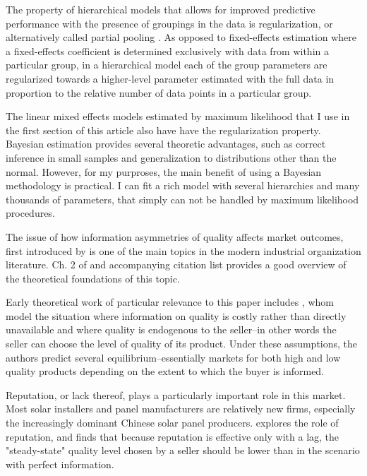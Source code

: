 \documentclass[a4paper]{article}
\begin{document}



The property of hierarchical models that allows for improved predictive performance with the presence of groupings in the data is regularization, or alternatively called partial pooling \citep{gelman_bayesian_2013}. As opposed to fixed-effects estimation where a fixed-effects coefficient is determined exclusively with data from within a particular group, in a hierarchical model each of the group parameters are regularized towards a higher-level parameter estimated with the full data in proportion to the relative number of data points in a particular group.

The linear mixed effects models estimated by maximum likelihood that I use in the first section of this article also have have the regularization property. Bayesian estimation provides several theoretic advantages, such as correct inference in small samples and generalization to distributions other than the normal. However, for my purproses, the main benefit of using a Bayesian methodology is practical. I can fit a rich model with several hierarchies and many thousands of parameters, that simply can not be handled by maximum likelihood procedures.

The issue of how information asymmetries of quality affects market outcomes, first introduced by \citet{akerlof_market_1970} is one of the main topics in the modern industrial organization literature. Ch. 2 of \citet{tirole_theory_1988} and accompanying citation list provides a good overview of the theoretical foundations of this topic.

Early theoretical work of particular relevance to this paper includes \citet{chan_prices_1982}, whom model the situation where information on quality is costly rather than directly unavailable and where quality is endogenous to the seller--in other words the seller can choose the level of quality of its product. Under these assumptions, the authors predict several equilibrium--essentially markets for both high and low quality products depending on the extent to which the buyer is informed.

Reputation, or lack thereof, plays a particularly important role in this market. Most solar installers and panel manufacturers are relatively new firms, especially the increasingly dominant Chinese solar panel producers. \citet{shapiro_consumer_1982} explores the role of reputation, and finds that because reputation is effective only with a lag, the "steady-state" quality level chosen by a seller should be lower than in the scenario with perfect information.
\end{document}
